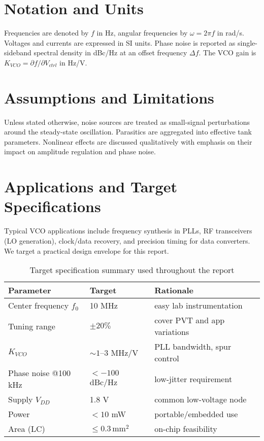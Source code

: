 \section{Notation and Units}
Frequencies are denoted by \(f\) in Hz, angular frequencies by \(\omega = 2\pi f\) in rad/s. Voltages and currents are expressed in SI units. Phase noise is reported as single-sideband spectral density in dBc/Hz at an offset frequency \(\Delta f\). The VCO gain is \(K_{VCO} = \partial f/\partial V_{ctrl}\) in Hz/V.

\section{Assumptions and Limitations}
Unless stated otherwise, noise sources are treated as small-signal perturbations around the steady-state oscillation. Parasitics are aggregated into effective tank parameters. Nonlinear effects are discussed qualitatively with emphasis on their impact on amplitude regulation and phase noise.

\section{Applications and Target Specifications}
Typical VCO applications include frequency synthesis in PLLs, RF transceivers (LO generation), clock/data recovery, and precision timing for data converters. We target a practical design envelope for this report.

\begin{table}[H]
  \centering
  \begin{tabular}{lll}
    \toprule
    Parameter & Target & Rationale \\
    \midrule
    Center frequency $f_0$ & 10 MHz & easy lab instrumentation \\
    Tuning range & $\pm20\%$ & cover PVT and app variations \\
    $K_{VCO}$ & $\sim 1$–$3$ MHz/V & PLL bandwidth, spur control \\
    Phase noise @100 kHz & $< -100$ dBc/Hz & low-jitter requirement \\
    Supply $V_{DD}$ & 1.8 V & common low-voltage node \\
    Power & $< 10$ mW & portable/embedded use \\
    Area (LC) & $\le 0.3\,\mathrm{mm}^2$ & on-chip feasibility \\
    \bottomrule
  \end{tabular}
  \caption{Target specification summary used throughout the report}
\end{table}

